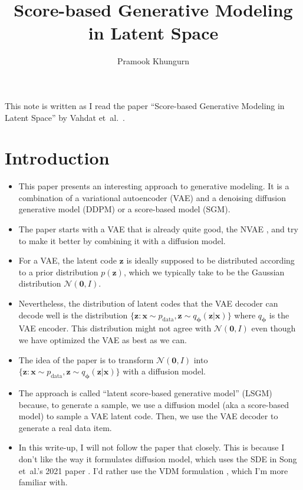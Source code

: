 \documentclass[10pt]{article}
\title{Score-based Generative Modeling in Latent Space}
\author{Pramook Khungurn}
\newcommand{\ve}[1]{\mathbf{#1}}
\newcommand{\ves}[1]{\boldsymbol{#1}}
\newcommand{\etal}{{et~al.}}
\newcommand{\mcal}[1]{\mathcal{#1}}
\newcommand{\data}{\mathrm{data}}
\begin{document}
\maketitle

This note is written as I read the paper ``Score-based Generative Modeling in Latent Space'' by Vahdat \etal~\cite{Vahdat:2021}.

\section{Introduction}

\begin{itemize}
  \item This paper presents an interesting approach to generative modeling. It is a combination of a variational autoencoder (VAE) and a denoising diffusion generative model (DDPM) or a score-based model (SGM).
  
  \item The paper starts with a VAE that is already quite good, the NVAE \cite{Vahdat:2021:NVAE}, and try to make it better by combining it with a diffusion model.
  
  \item For a VAE, the latent code $\ve{z}$ is ideally supposed to be distributed according to a prior distribution $p(\ve{z})$, which we typically take to be the Gaussian distribution $\mcal{N}(\ve{0},I)$.
  
  \item Nevertheless, the distribution of latent codes that the VAE decoder can decode well is the distribution $\{ \ve{z}: \ve{x} \sim p_{\data}, \ve{z} \sim q_{\ves{\phi}}(\ve{z}|\ve{x}) \}$ where $q_{\ves{\phi}}$ is the VAE encoder. This distribution might not agree with $\mcal{N}(\ve{0},I)$ even though we have optimized the VAE as best as we can.
  
  \item The idea of the paper is to transform $\mcal{N}(\ve{0},I)$ into $\{ \ve{z}: \ve{x} \sim p_{\data}, \ve{z} \sim q_{\ves{\phi}}(\ve{z}|\ve{x}) \}$ with a diffusion model.
  
  \item The approach is called ``latent score-based generative model'' (LSGM) because, to generate a sample, we use a diffusion model (aka a score-based model) to sample a VAE latent code. Then, we use the VAE decoder to generate a real data item.
  
  \item In this write-up, I will not follow the paper that closely. This is because I don't like the way it formulates diffusion model, which uses the SDE in Song \etal's 2021 paper \cite{Song:2021}. I'd rather use the VDM formulation \cite{Kingma:2021}, which I'm more familiar with.
\end{itemize}
\end{document}
